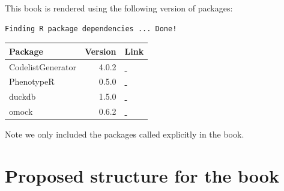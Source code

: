 \documentclass[
  letterpaper,
  oneside,
  open=any]{scrbook}
\begin{document}

This book is rendered using the following version of packages:

\begin{verbatim}
Finding R package dependencies ... Done!
\end{verbatim}

\begin{table}
\fontsize{12.0pt}{14.0pt}\selectfont
\begin{tabular*}{\linewidth}{@{\extracolsep{\fill}}lrl}
\toprule
Package & Version & Link \\ 
\midrule\addlinespace[2.5pt]
CodelistGenerator & 4.0.2 & \href{https://darwin-eu.github.io/CodelistGenerator/}{🔗} \\ 
PhenotypeR & 0.5.0 & \href{https://ohdsi.github.io/PhenotypeR/}{🔗} \\ 
duckdb & 1.5.0 & \href{https://r.duckdb.org/}{🔗} \\ 
omock & 0.6.2 & \href{https://ohdsi.github.io/omock/}{🔗} \\ 
\bottomrule
\end{tabular*}
\end{table}

Note we only included the packages called explicitly in the book.


\chapter{Proposed structure for the
book}\label{proposed-structure-for-the-book}
\end{document}
